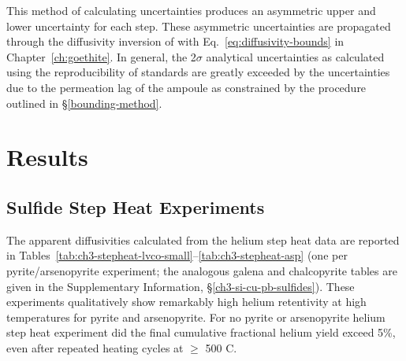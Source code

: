 This method of calculating uncertainties produces an asymmetric upper
and lower uncertainty for each step. These asymmetric uncertainties are propagated 
through the diffusivity inversion of \citet{fechtigkalbitzer1966} with Eq.~\eqref{eq:diffusivity-bounds}
in Chapter~\ref{ch:goethite}. In general, the 2$\sigma$ analytical uncertainties as calculated using the
reproducibility of standards are greatly exceeded by the uncertainties
due to the permeation lag of the ampoule as constrained by the procedure outlined in \S\ref{bounding-method}.

\section{Results}\label{sec:ch3-results}

\subsection{Sulfide Step Heat Experiments}\label{ch3-sulfide-step-heat-experiments}
The apparent diffusivities calculated from the helium step heat data are
reported in Tables~\ref{tab:ch3-stepheat-lvco-small}--\ref{tab:ch3-stepheat-asp}
(one per pyrite/arsenopyrite experiment; the analogous galena and
chalcopyrite tables are given in the Supplementary Information,
\S\ref{ch3-si-cu-pb-sulfides}). These experiments qualitatively show remarkably high helium
retentivity at high temperatures for pyrite and arsenopyrite. For no
pyrite or arsenopyrite helium step heat experiment did the final
cumulative fractional helium yield exceed 5\%, even after repeated heating cycles at $\geq$ 500 \textdegree C.

\ChThreeStepHeatLVCOSmall
\ChThreeStepHeatLVCOBig
\ChThreeStepHeatLVCOIsolated
\ChThreeStepHeatAsp

